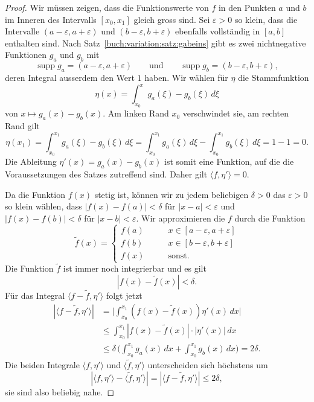 

\begin{proof}
Wir müssen zeigen, dass die Funktionswerte von $f$ in den Punkten $a$ und $b$
im Inneren des Intervalls $[x_0,x_1]$ gleich gross sind.
Sei $\varepsilon>0$ so klein, dass die Intervalle
$(a-\varepsilon,a+\varepsilon)$ und $(b-\varepsilon,b+\varepsilon)$ ebenfalls
vollständig in $[a,b]$ enthalten sind.
Nach Satz~\ref{buch:variation:satz:gabeins} gibt es zwei nichtnegative
Funktionen $g_a$ und $g_b$ mit
\[
\operatorname{supp} g_a = (a-\varepsilon,a+\varepsilon)
\qquad\text{und}\qquad
\operatorname{supp} g_b = (b-\varepsilon,b+\varepsilon),
\]
deren Integral ausserdem den Wert $1$ haben.
Wir wählen für $\eta$ die Stammfunktion
\[
\eta(x)
=
\int_{x_0}^x g_a(\xi)-g_b(\xi)\,d\xi
\]
von $x\mapsto g_a(x) -g_b(x)$.
Am linken Rand $x_0$ verschwindet sie, am rechten Rand gilt
\[
\eta(x_1)
=
\int_{x_0}^{x_1}
g_a(\xi)-g_b(\xi)
\,d\xi
=
\int_{x_0}^{x_1}
g_a(\xi)
\,d\xi
-
\int_{x_0}^{x_1}
g_b(\xi)
\,d\xi
=
1-1
=
0.
\]
Die Ableitung $\eta'(x)=g_a(x)-g_b(x)$ ist somit eine Funktion,
auf die die Voraussetzungen des Satzes zutreffend sind.
Daher gilt $\langle f,\eta'\rangle=0$.

Da die Funktion $f(x)$ stetig ist, können wir zu jedem beliebigen 
$\delta>0$ das $\varepsilon>0$ so klein wählen, dass 
$|f(x)-f(a)|<\delta$ für $|x-a|<\varepsilon$ und
$|f(x)-f(b)|<\delta$ für $|x-b|<\varepsilon$.
Wir approximieren die $f$ durch die Funktion
\[
\tilde{f}(x)
=
\begin{cases}
f(a)&\qquad x\in[a-\varepsilon,a+\varepsilon]\\
f(b)&\qquad x\in[b-\varepsilon,b+\varepsilon]\\
f(x)&\qquad\text{sonst}.
\end{cases}
\]
Die Funktion $\tilde{f}$ ist immer noch integrierbar und es gilt
\[
|f(x)-\tilde{f}(x)| < \delta.
\]
Für das Integral $\langle f-\tilde{f}, \eta'\rangle$ folgt jetzt
\begin{align*}
|\langle f-\tilde{f},\eta'\rangle|
&=
\biggl|
\int_{x_0}^{x_1}
(f(x)-\tilde{f}(x))\eta'(x)
\,dx
\biggr|
\\
&\le
\int_{x_0}^{x_1}
|f(x)-\tilde{f}(x)| \cdot |\eta'(x)|
\,dx
\\
&\le 
\delta
\,
\biggl(
\int_{x_0}^{x_1} g_a(x)\,dx
+
\int_{x_0}^{x_1} g_b(x)\,dx
\biggr)
=
2\delta.
\end{align*}
Die beiden Integrale $\langle f,\eta'\rangle$ und 
$\langle \tilde{f},\eta'\rangle$ unterscheiden sich höchstens um
\begin{equation}
|\langle f,\eta'\rangle - \langle \tilde{f},\eta'\rangle|
=
|\langle f-\tilde{f},\eta' \rangle|
\le
2\delta,
\label{buch:nichtdiff:duboisreymond:eqn:ftildef}
\end{equation}
sie sind also beliebig nahe.


\end{proof}

